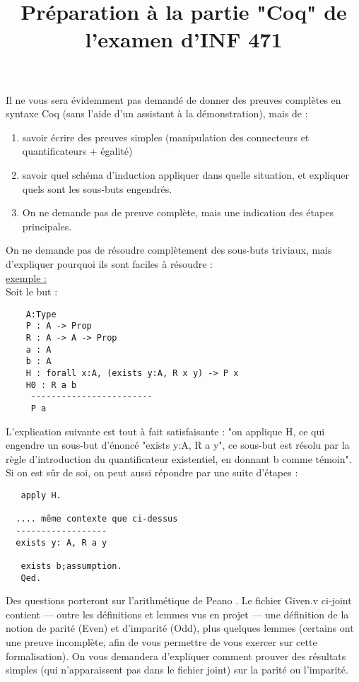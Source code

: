 \documentclass{article}
\title{Préparation à la partie "Coq" de l'examen d'INF 471}
\begin{document}
\maketitle


 Il ne vous sera évidemment pas demandé de donner des preuves complètes en syntaxe Coq (sans l'aide d'un assistant à la démonstration), mais de :
 \begin{enumerate}
\item savoir écrire des preuves simples (manipulation des connecteurs et quantificateurs  +  égalité)
\item savoir quel schéma d'induction appliquer dans quelle situation, et expliquer  quels sont les sous-buts engendrés.
\item On ne demande pas de preuve complète, mais une indication des étapes principales.
\end{enumerate}
    
\noindent On ne demande pas de résoudre complètement des sous-buts triviaux, mais d'expliquer  pourquoi ils sont faciles à résoudre :\\

\noindent \underline{exemple :}\\

Soit le but :
\begin{verbatim}
    A:Type
    P : A -> Prop
    R : A -> A -> Prop
    a : A
    b : A
    H : forall x:A, (exists y:A, R x y) -> P x
    H0 : R a b
     ------------------------
     P a
\end{verbatim}

\noindent L'explication suivante est tout à fait satisfaisante : "on applique H, ce qui engendre un sous-but d'énoncé  "exists y:A, R a y",  ce sous-but est résolu par la règle d'introduction du quantificateur existentiel, en  donnant b comme témoin". Si on est sûr de soi, on peut aussi répondre par une suite d'étapes :
\begin{verbatim}
   apply H.

  .... même contexte que ci-dessus
  ------------------
  exists y: A, R a y

   exists b;assumption.
   Qed.
\end{verbatim}

\noindent Des questions porteront sur l'arithmétique de Peano . Le fichier Given.v  ci-joint contient --- outre les définitions et lemmes vus en projet --- une définition de la notion de parité (Even) et d'imparité (Odd), plus quelques lemmes (certains ont une preuve incomplète, afin de vous permettre de vous exercer sur cette formalisation). On vous demandera d'expliquer comment prouver des résultats simples (qui n'apparaissent pas dans le fichier joint) sur la parité ou l'imparité.
\end{document}
